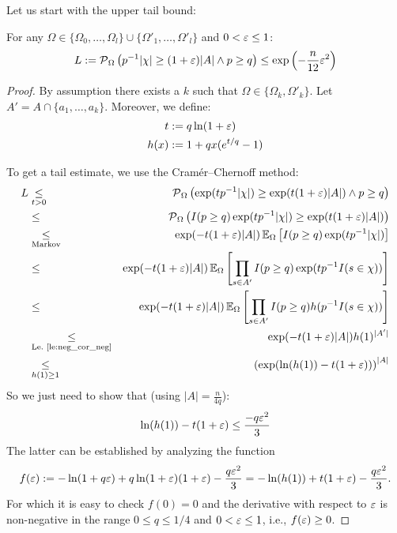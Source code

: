 Let us start with the upper tail bound:
\begin{lemma}
\label{le:upper_tail}
For any $\Omega \in \{\Omega_0,\ldots,\Omega_l\} \cup \{\Omega'_1,\ldots,\Omega'_l\}$ and
$0 < \varepsilon \leq 1$:
\[
L := \operatorname{\mathcal P}_{\Omega} \left( p^{-1} |\chi| \geq (1+\varepsilon) |A| \wedge p \geq q\right) \leq
  \exp\left(-\frac{n}{12} \varepsilon^2\right)
\]
\end{lemma}
\begin{proof}
By assumption there exists a $k$ such that $\Omega \in \{\Omega_k, \Omega'_k\}$.
Let $A' = A \cap \{a_1,\ldots,a_k\}$.
Moreover, we define:
\begin{align*}
  t & := q \ln( 1 + \varepsilon) \\
  h(x) & := 1+qx(e^{t/q}-1)  
\end{align*}

To get a tail estimate, we use the Cram\'{e}r--Chernoff method:
{\allowdisplaybreaks
\begin{eqnarray*}
  L & \underset{t > 0}{\leq} & \operatorname{\mathcal P}_{\Omega} \left( \exp(t p^{-1} |\chi|) \geq
    \exp(t (1+\varepsilon) |A|) \wedge p \geq q \right) \\
  & \leq &
    \operatorname{\mathcal P}_{\Omega} \left( I(p \geq q) \exp(t p^{-1} |\chi|) \geq \exp(t (1+\varepsilon) |A|) \right) \\
  & \underset{\textrm{Markov}}{\leq} &
    \exp( -t (1+\varepsilon) |A| ) \operatorname{\mathbb E}_\Omega \left[ I(p \geq q) \exp ( t p^{-1} |\chi| ) \right] \\
 & \leq & \exp( -t (1+\varepsilon) |A| ) 
  \operatorname{\mathbb E}_\Omega \left[ \prod_{s \in A'} I(p \geq q) \exp ( t p^{-1} I(s \in \chi) ) \right] \\
 & \leq & \exp( -t (1+\varepsilon) |A| ) 
  \operatorname{\mathbb E}_\Omega \left[ \prod_{s \in A'} I(p \geq q) h( p^{-1} I(s \in \chi) ) \right] \\
 & \underset{\textrm{Le.~\ref{le:neg_cor_neg}}}{\leq} & \exp( -t (1+\varepsilon) |A| ) h(1)^{|A'|} \\
 & \underset{h(1)\geq 1}{\leq} & \left(\exp( \ln(h(1)) -t (1+\varepsilon))\right) ^ {|A|} 
\end{eqnarray*}}
So we just need to show that (using $|A|=\frac{n}{4q}$):
\[
  \ln(h(1))-t (1+\varepsilon) \leq \frac{-q \varepsilon^2}{3}
\]
The latter can be established by analyzing the function
\[
  f(\varepsilon) := -\ln(1+q \varepsilon) + q \ln(1+\varepsilon) (1+\varepsilon) - \frac{q \varepsilon^2}{3} =
    -\ln (h(1)) +t (1+\varepsilon) - \frac{q\varepsilon^2}{3} \textrm{.}
\]
For which it is easy to check $f(0) = 0$ and the derivative with respect to $\varepsilon$ is non-negative
in the range $0 \leq q \leq 1/4$ and $0 < \varepsilon \leq 1$, i.e., $f(\varepsilon) \geq 0$.
\end{proof}

